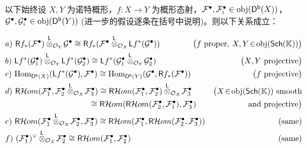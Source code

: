 \begin{Pro}\label{lotofequalities}
以下始终设 $X,Y$ 为诺特概形，$f:X\rightarrow Y$ 为概形态射，$\mathcal{F}^\bullet, \mathcal{F}_i^\bullet\in\textup{obj}(\mathsf{D^b}(X))$，$\mathcal{G}^\bullet, \mathcal{G}_i^\bullet\in\textup{obj}(\mathsf{D^b}(Y))$ \textup(进一步的假设逐条在括号中说明\textup)。则以下关系成立：\begin{small}
	\begingroup
	\allowdisplaybreaks
	\begin{align}
		&a)\mkern+6mu\mathsf{R}f_*(\mathcal{F}^\bullet)\overset{\mathsf{L}}{\otimes}_{\mathcal{O}_Y}\!\mathcal{G}^\bullet\cong\mathsf{R}f_*(\mathcal{F}^\bullet\overset{\mathsf{L}}{\otimes}_{\mathcal{O}_X}\!\mathsf{L}f^*(\mathcal{G}^\bullet)) &\mkern-50mu\big(f\text{ proper},\, X,Y\!\in\!\textup{obj}(\mathsf{Sch}(\mathbb{K}))\big) \nonumber \\
		&b)\mkern+6mu\mathsf{L}f^*(\mathcal{G}_1^\bullet)\overset{\mathsf{L}}{\otimes}_{\mathcal{O}_Y}\!\mathsf{L}f^*(\mathcal{G}_2^\bullet)\cong \mathsf{L}f^*(\mathcal{G}_1^\bullet\overset{\mathsf{L}}{\otimes}_{\mathcal{O}_Y}\!\mathcal{G}_2^\bullet) &\big(X,Y\text{ projective}\big) \nonumber \\
		&c)\mkern+6mu\textup{Hom}_{\mathsf{D^b}(X)}(\mathsf{L}f^*(\mathcal{G}^\bullet),\mathcal{F}^\bullet)\cong \textup{Hom}_{\mathsf{D^b}(Y)}(\mathcal{G}^\bullet,\mathsf{R}f_*(\mathcal{F}^\bullet)) &\big(f\text{ projective}\big) \nonumber \\
		&d)\mkern+6mu\mathsf{R}\mathcal{H}om(\mathcal{F}_1^\bullet,\mathcal{F}_2^\bullet\overset{\mathsf{L}}{\otimes}_{\mathcal{O}_X}\!\mathcal{F}_3^\bullet)\cong\mathsf{R}\mathcal{H}om(\mathcal{F}_1^\bullet,\mathcal{F}_2^\bullet)\overset{\mathsf{L}}{\otimes}_{\mathcal{O}_X}\!\mathcal{F}_3^\bullet  &\big(X\!\in\!\textup{obj}(\mathsf{Sch}(\mathbb{K}))\text{ smooth} \nonumber \\
		& \mkern+187mu\cong\mathsf{R}\mathcal{H}om(\mathsf{R}\mathcal{H}om(\mathcal{F}_2^\bullet,\mathcal{F}_1^\bullet),\mathcal{F}_3^\bullet) &\text{and projective}\big) \nonumber \\
		&e)\mkern+6mu\mathsf{R}\mathcal{H}om(\mathcal{F}_1^\bullet\overset{\mathsf{L}}{\otimes}_{\mathcal{O}_X}\!\mathcal{F}_2^\bullet,\mathcal{F}_3^\bullet)\cong\mathsf{R}\mathcal{H}om(\mathcal{F}_1^\bullet,\mathsf{R}\mathcal{H}om(\mathcal{F}_2^\bullet,\mathcal{F}_3^\bullet)) & (\text{same}) \nonumber \\
		&f)\mkern+6mu(\mathcal{F}_1^\bullet)^\vee\overset{\mathsf{L}}{\otimes}_{\mathcal{O}_X}\!\mathcal{F}_2^\bullet\cong \mathsf{R}\mathcal{H}om(\mathcal{F}_1^\bullet,\mathcal{F}_2^\bullet) & (\text{same}) \nonumber \\

\end{align}
\end{small}
\end{Pro}
